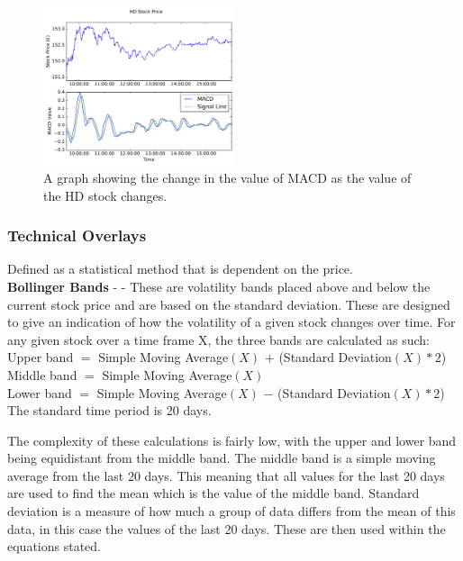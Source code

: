 \documentclass[conference]{IEEEtran}
\begin{document}
\begin{figure}
\includegraphics[width=0.5\textwidth, angle=0]{HDDayMACD.pdf}
\caption{A graph showing the change in the value of MACD as the value of the HD stock changes.}
\label{fig:HDDayMACD}
\end{figure}

\subsubsection{Technical Overlays} Defined as a statistical method that is dependent on the price. \\

\textbf{Bollinger Bands} - \cite{Bollinger1992} - These are volatility bands placed above and below the current stock price and are based on the standard deviation. These are designed to give an indication of how the volatility of a given stock changes over time. For any given stock over a time frame X, the three bands are calculated as such:\\

\noindent
Upper band $=$ Simple Moving Average$(X)$ $+$ (Standard Deviation$(X) * 2$)\\
Middle band $=$ Simple Moving Average$(X)$\\
Lower band $=$ Simple Moving Average$(X)$ $-$ (Standard Deviation$(X) * 2$)\\
The standard time period is 20 days.

The complexity of these calculations is fairly low, with the upper and lower band being equidistant from the middle band. The middle band is a simple moving average from the last 20 days. This meaning that all values for the last 20 days are used to find the mean which is the value of the middle band. Standard deviation is a measure of how much a group of data differs from the mean of this data, in this case the values of the last 20 days. These are then used within the equations stated.\\
\end{document}
